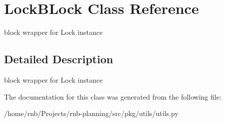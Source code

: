 \hypertarget{class_lock_b_lock}{}\section{Lock\+B\+Lock Class Reference}
\label{class_lock_b_lock}


block wrapper for Lock instance  




\subsection{Detailed Description}
block wrapper for Lock instance 

The documentation for this class was generated from the following file\+:\begin{DoxyCompactItemize}
\item 
/home/rnb/\+Projects/rnb-\/planning/src/pkg/utils/utils.\+py\end{DoxyCompactItemize}
